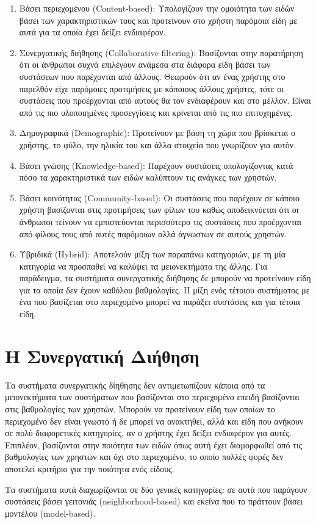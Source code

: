 \begin{enumerate}
 \item Βάσει περιεχομένου ({\en Content-based}): Υπολογίζουν την ομοιότητα των ειδών βάσει των χαρακτηριστικών τους και προτείνουν στο χρήστη παρόμοια είδη με αυτά για τα οποία έχει δείξει ενδιαφέρον.
 \item Συνεργατικής διήθησης ({\en Collaborative filtering}): Bασίζονται στην παρατήρηση ότι οι άνθρωποι συχνά επιλέγουν ανάμεσα στα διάφορα είδη βάσει των συστάσεων που παρέχονται από άλλους.  Θεωρούν ότι αν ένας χρήστης στο παρελθόν είχε παρόμοιες προτιμήσεις με κάποιους άλλους χρήστες, τότε οι συστάσεις που προέρχονται από αυτούς θα τον ενδιαφέρουν και στο μέλλον. Είναι από τις πιο υλοποιημένες προσεγγίσεις \cite{ricci2011recommender} και κρίνεται από τις πιο επιτυχημένες.\cite{Nikolakopoulos2015126}
 \item Δημογραφικά ({\en Demographic}): Προτείνουν με βάση τη χώρα που βρίσκεται ο χρήστης, το φύλο, την ηλικία του και άλλα στοιχεία που γνωρίζουν για αυτόν.
 \item Βάσει γνώσης ({\en Knowledge-based}): Παρέχουν συστάσεις υπολογίζοντας κατά πόσο τα χαρακτηριστικά των ειδών καλύπτουν τις ανάγκες των χρηστών.
 \item Βάσει κοινότητας ({\en Community-based}): Οι συστάσεις που παρέχουν σε κάποι\-ο χρήστη βασίζονται στις προτιμήσεις των φίλων του καθώς αποδεικνύεται ότι οι άνθρωποι τείνουν να εμπιστεύονται περισσότερο τις συστάσεις που προέρχονται από φίλους τους από αυτές παρόμοιων αλλά άγνωστων σε αυτούς χρηστών. \cite{conf/delos/SinhaS01}
 \item Υβριδικά ({\en Hybrid}): Αποτελούν μίξη των παραπάνω κατηγοριών, με τη μία κατηγορία να προσπαθεί να καλύψει τα μειονεκτήματα της άλλης. Για παράδειγμα, τα συστήματα συνεργατικής διήθησης δε μπορούν να προτείνουν είδη για τα οποία δεν έχουν καθόλου βαθμολογίες. Η μίξη ενός τέτοιου συστήματος με ένα που βασίζεται στο περιεχομένο μπορεί να παράξει συστάσεις και για τέτοια είδη. 
\end{enumerate} 
\section{Η Συνεργατική Διήθηση}
Τα συστήματα συνεργατικής δίηθησης δεν αντιμετωπίζουν κάποια από τα μειονεκτήματα των συστήματων που βασίζονται στο περιεχομένο επειδή βασίζονται στις βαθμολογίες των χρηστών. Μπορούν να προτείνουν είδη των οποίων το περιεχομένο δεν είναι γνωστό ή δε μπορεί να ανακτηθεί, αλλά και είδη που ανήκουν σε πολύ διαφορετικές κατηγορίες, αν ο χρήστης έχει δείξει ενδιαφέρον για αυτές. Επιπλέον, βασίζονται στην ποιότητα των ειδών όπως αυτή έχει διαμορφωθεί από τις βαθμολογίες των χρηστών και όχι στο περιεχομένο, το οποίο πολλές φορές δεν αποτελεί κριτήριο για την ποιότητα ενός είδους. \cite{ricci2011recommender}\par  
Τα συστήματα αυτά διαχωρίζονται σε δύο γενικές κατηγορίες: σε αυτά που παράγουν συστάσεις βάσει γειτονιάς ({\en neighborhood-based}) και εκείνα που το πράττουν βάσει μοντέλου ({\en model-based}).
 
